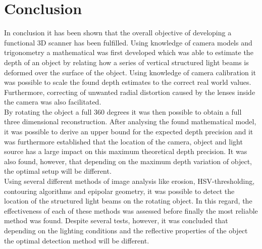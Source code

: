 \newpage
\section{Conclusion}

In conclusion it has been shown that the overall objective of developing a functional 3D scanner has been fulfilled. Using knowledge of camera models and trigonometry a mathematical was first developed which was able to estimate the depth of an object by relating how a series of vertical structured light beams is deformed over the surface of the object. Using knowledge of camera calibration it was possible to scale the found depth estimates to the correct real world values. Furthermore, correcting of unwanted radial distortion caused by the lenses inside the camera was also facilitated. \\


By rotating the object a full 360 degrees it was then possible to obtain a full three dimensional reconstruction. After analysing the found mathematical model, it was possible to derive an upper bound for the expected depth precision and it was furthermore established that the location of the camera, object and light source has a large impact on this maximum theoretical depth precision. It was also found, however, that depending on the maximum depth variation of object, the optimal setup will be different.\\

Using several different methods of image analysis like erosion, HSV-thresholding, contouring algorithms and epipolar geometry, it was possible to detect the location of the structured light beams on the rotating object. In this regard, the effectiveness of each of these methods was assessed before finally the most reliable method was found. Despite several tests, however, it was concluded that depending on the lighting conditions and the reflective properties of the object the optimal detection method will be different.\\

